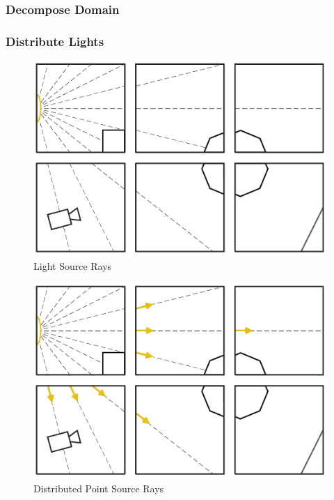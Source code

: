 \documentclass{vgtc}                          %
\begin{document}
\subsubsection{Decompose Domain}
\subsubsection{Distribute Lights}

\begin{figure}[htb]
  \centering
  \includegraphics[width=\columnwidth]{./../img/Lights1.pdf}
  \caption{Light Source Rays}
\end{figure}

\begin{figure}[htb]
  \centering
  \includegraphics[width=\columnwidth]{./../img/Lights2.pdf}
  \caption{Distributed Point Source Rays}
\end{figure}
\end{document}
